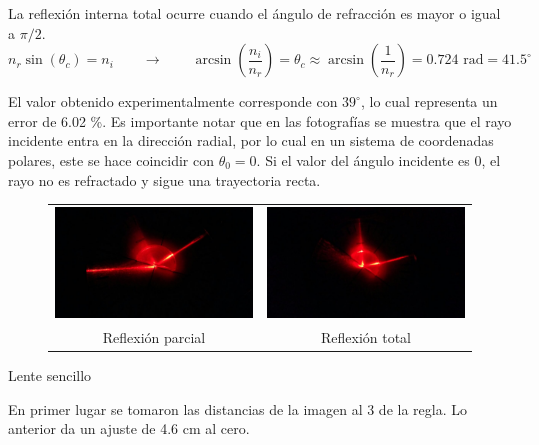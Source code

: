 \documentclass[addpoints,10pt]{exam}
\begin{document}
\begin{questions}
		La reflexi\'on interna total ocurre cuando el \'angulo de refracci\'on es mayor o igual a $\pi/2$.
		\begin{equation}
			n_r\sin(\theta_c) = n_i \qquad \longrightarrow \qquad \arcsin\left(\dfrac{n_i}{n_r}\right) = \theta_c \approx\arcsin\left(\dfrac{1}{n_r}\right) = 0.724\text{ rad} = 41.5^\circ
		\end{equation}
		
		El valor obtenido experimentalmente corresponde con $39^\circ$, lo cual representa un error de 6.02 \%. Es importante notar que en las fotograf\'ias se muestra que el rayo incidente entra en la direcci\'on radial, por lo cual en un sistema de coordenadas polares, este se hace coincidir con $\theta_0 = 0$. Si el valor del \'angulo incidente es 0, el rayo no es refractado y sigue una trayectoria recta.
		\begin{figure}[h]
			\centering
			\begin{tabular}{cc}
				\includegraphics[width=0.4\linewidth]{reflexionparcial.jpeg} &
				\includegraphics[width=0.4\linewidth]{reflexiontotal.jpeg} \\
				Reflexi\'on parcial & Reflexi\'on total
			\end{tabular}
		\end{figure}
		
		{\question Lente sencillo}
		
		En primer lugar se tomaron las distancias de la imagen al $3$ de la regla. Lo anterior da un ajuste de 4.6 cm al cero.
		

\end{questions}
\end{document}
